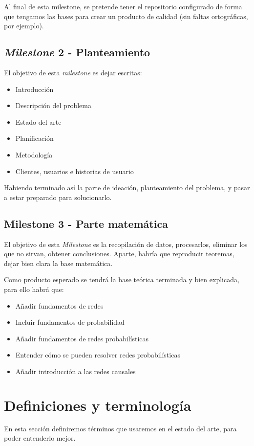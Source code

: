 Al final de esta milestone, se pretende tener el repositorio configurado de forma que tengamos las 
bases para crear un producto de calidad (sin faltas ortográficas, por ejemplo).

\subsection{\textit{Milestone} 2 - Planteamiento}
El objetivo de esta \textit{milestone} es dejar escritas:

\begin{itemize}
    \item Introducción
    \item Descripción del problema
    \item Estado del arte
    \item Planificación
    \item Metodología
    \item Clientes, usuarios e historias de usuario
\end{itemize}

Habiendo terminado así la parte de ideación, planteamiento del problema, y pasar a estar preparado para solucionarlo.

\subsection{Milestone 3 - Parte matemática} 
El objetivo de esta \textit{Milestone} es la recopilación de datos, procesarlos, eliminar los que 
no sirvan, obtener conclusiones. Aparte, habría que reproducir teoremas, dejar bien clara la base matemática.

Como producto esperado se tendrá la base teórica terminada y bien explicada, para ello habrá que: 

\begin{itemize}
    \item Añadir fundamentos de redes
    \item Incluir fundamentos de probabilidad 
    \item Añadir fundamentos de redes probabilísticas 
    \item Entender cómo se pueden resolver redes probabilísticas 
    \item Añadir introducción a las redes causales 
\end{itemize}

 

\section{Definiciones y terminología}
En esta sección definiremos términos que usaremos en el estado del arte, para poder entenderlo mejor.

\begin{definicion}
    
\end{definicion}

\begin{definicion}
    
\end{definicion}

\begin{definicion}[Entropía]
    
\end{definicion}

\begin{definicion}
    
\end{definicion}